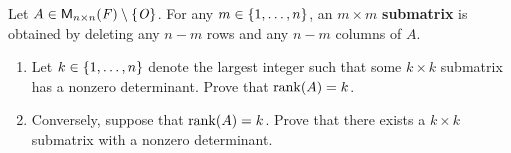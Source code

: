 \begin{ex}\label{ex:4.3.23}
  Let \(A \in \ms[n][n][\F] \setminus \set{\zm}\).
  For any \(m \in \left\lbrace1, \dots, n\right\rbrace\), an \(m \times m\) \textbf{submatrix} is obtained by deleting any \(n - m\) rows and any \(n - m\) columns of \(A\).
  \begin{enumerate}
    \item Let \(k \in \left\lbrace1, \dots, n\right\rbrace\) denote the largest integer such that some \(k \times k\) submatrix has a nonzero determinant.
          Prove that \(\rk{A} = k\).
    \item Conversely, suppose that \(\rk{A} = k\).
          Prove that there exists a \(k \times k\) submatrix with a nonzero determinant.
  \end{enumerate}
\end{ex}

